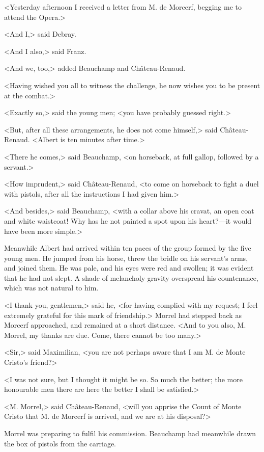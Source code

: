  <Yesterday afternoon I received a letter from M. de Morcerf, begging me to attend the Opera.> 

 <And I,> said Debray. 

 <And I also,> said Franz. 

 <And we, too,> added Beauchamp and Château-Renaud. 

 <Having wished you all to witness the challenge, he now wishes you to be present at the combat.> 

 <Exactly so,> said the young men; <you have probably guessed right.> 

 <But, after all these arrangements, he does not come himself,> said Château-Renaud. <Albert is ten minutes after time.> 

 <There he comes,> said Beauchamp, <on horseback, at full gallop, followed by a servant.> 

 <How imprudent,> said Château-Renaud, <to come on horseback to fight a duel with pistols, after all the instructions I had given him.> 

 <And besides,> said Beauchamp, <with a collar above his cravat, an open coat and white waistcoat! Why has he not painted a spot upon his heart?—it would have been more simple.> 

 Meanwhile Albert had arrived within ten paces of the group formed by the five young men. He jumped from his horse, threw the bridle on his servant's arms, and joined them. He was pale, and his eyes were red and swollen; it was evident that he had not slept. A shade of melancholy gravity overspread his countenance, which was not natural to him. 

 <I thank you, gentlemen,> said he, <for having complied with my request; I feel extremely grateful for this mark of friendship.> Morrel had stepped back as Morcerf approached, and remained at a short distance. <And to you also, M. Morrel, my thanks are due. Come, there cannot be too many.>

<Sir,> said Maximilian, <you are not perhaps aware that I am M. de Monte Cristo's friend?> 

 <I was not sure, but I thought it might be so. So much the better; the more honourable men there are here the better I shall be satisfied.> 

 <M. Morrel,> said Château-Renaud, <will you apprise the Count of Monte Cristo that M. de Morcerf is arrived, and we are at his disposal?> 

 Morrel was preparing to fulfil his commission. Beauchamp had meanwhile drawn the box of pistols from the carriage. 

